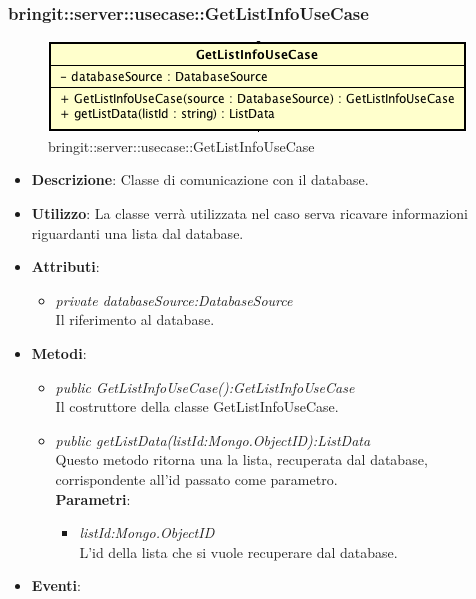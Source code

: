 \subsubsection{bringit::server::usecase::GetListInfoUseCase}

\label{bringit::server::usecase::GetListInfoUseCase}
\begin{figure}[H]
	\centering
	\includegraphics[scale=0.5]{Sezioni/SottosezioniST/img/app/GetListInfoUseCase.png}
	\caption{bringit::server::usecase::GetListInfoUseCase}
\end{figure}

\begin{itemize}
\item \textbf{Descrizione}: Classe di comunicazione con il database.
\item \textbf{Utilizzo}: La classe verrà utilizzata nel caso serva ricavare informazioni riguardanti una lista dal database.
\item \textbf{Attributi}: 
	\begin{itemize}
	\item \textit{private databaseSource:DatabaseSource}\\
	Il riferimento al database.
	\end{itemize}
\item \textbf{Metodi}:
	\begin{itemize}
	\item \textit{public GetListInfoUseCase():GetListInfoUseCase}\\
	Il costruttore della classe GetListInfoUseCase.
	\item \textit{public getListData(listId:Mongo.ObjectID):ListData}\\
	Questo metodo ritorna una la lista, recuperata dal database, corrispondente all'id passato come parametro.
				\\ \textbf{Parametri}: \begin{itemize}
			\item \textit{listId:Mongo.ObjectID}\\
			L'id della lista che si vuole recuperare dal database.
					\end{itemize} 
	\end{itemize}
\item \textbf{Eventi}:
\end{itemize}

